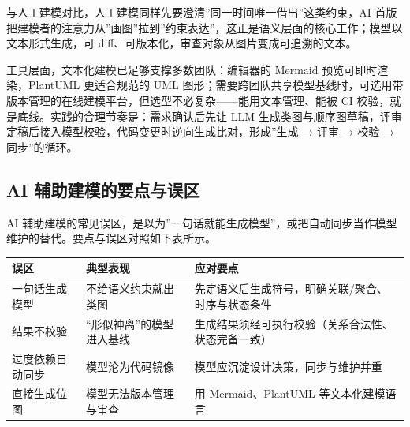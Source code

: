 \documentclass[
]{ctexbook}
\newcounter{none}
\begin{document}
与人工建模对比，人工建模同样先要澄清''同一时间唯一借出''这类约束，AI
首版把建模者的注意力从''画图''拉到''约束表达''，这正是语义层面的核心工作；模型以文本形式生成，可
diff、可版本化，审查对象从图片变成可追溯的文本。

工具层面，文本化建模已足够支撑多数团队：编辑器的 Mermaid
预览可即时渲染，PlantUML 更适合规范的 UML
图形；需要跨团队共享模型基线时，可选用带版本管理的在线建模平台，但选型不必复杂------能用文本管理、能被
CI 校验，就是底线。实践的合理节奏是：需求确认后先让 LLM
生成类图与顺序图草稿，评审定稿后接入模型校验，代码变更时逆向生成比对，形成''生成
→ 评审 → 校验 → 同步''的循环。

\subsection{AI
辅助建模的要点与误区}\label{ai-ux8f85ux52a9ux5efaux6a21ux7684ux8981ux70b9ux4e0eux8befux533a}

AI
辅助建模的常见误区，是以为''一句话就能生成模型''，或把自动同步当作模型维护的替代。要点与误区对照如下表所示。

{\def\LTcaptype{none} %
\begin{longtable}[]{@{}
  >{\raggedright\arraybackslash}p{}
  >{\raggedright\arraybackslash}p{}
  >{\raggedright\arraybackslash}p{}@{}}
\toprule\noalign{}
\begin{minipage}[b]{\linewidth}\raggedright
误区
\end{minipage} & \begin{minipage}[b]{\linewidth}\raggedright
典型表现
\end{minipage} & \begin{minipage}[b]{\linewidth}\raggedright
应对要点
\end{minipage} \\
\midrule\noalign{}
\endhead
\bottomrule\noalign{}
\endlastfoot
一句话生成模型 & 不给语义约束就出类图 &
先定语义后生成符号，明确关联/聚合、时序与状态条件 \\
结果不校验 & ``形似神离''的模型进入基线 &
生成结果须经可执行校验（关系合法性、状态完备一致） \\
过度依赖自动同步 & 模型沦为代码镜像 &
模型应沉淀设计决策，同步与维护并重 \\
直接生成位图 & 模型无法版本管理与审查 & 用 Mermaid、PlantUML
等文本化建模语言 \\
\end{longtable}
}
\end{document}
